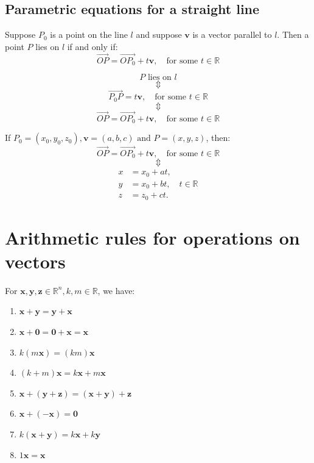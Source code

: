 \documentclass[11pt]{article}
\begin{document}
\newpage
\subsection{Parametric equations for a straight line}
\label{sec:org9b8d02a}
Suppose \(P_0\) is a point on the line \(l\) and suppose \(\boldsymbol{v}\) is a vector parallel to \(l\). Then a point \(P\) lies on \(l\) if and only if:
\[\overrightarrow{OP} = \overrightarrow{OP_0} + t \boldsymbol{v}, \quad \text{for some } t \in \mathbb{R}\]

\[P \text{ lies on } l\]
\[\Updownarrow\]
\[\overrightarrow{P_0 P} = t \boldsymbol{v}, \quad \text{for some } t \in \mathbb{R}\]
\[\Updownarrow\]
\[\overrightarrow{OP} = \overrightarrow{OP_0} + t \boldsymbol{v}, \quad \text{for some } t \in \mathbb{R}\]


If \(P_0 = (x_0, y_0, z_0), \boldsymbol{v} = (a, b, c) \text{ and } P = (x, y, z)\), then:
\[\overrightarrow{OP} = \overrightarrow{OP_0} + t \boldsymbol{v}, \quad \text{for some } t \in \mathbb{R}\]
\[\Updownarrow\]
\begin{align*}
x &= x_0 + at, \\
y &= x_0 + bt, \quad t \in \mathbb{R} \\
z &= z_0 + ct.
\end{align*}
\section{Arithmetic rules for operations on vectors}
\label{sec:org078b912}
For \(\boldsymbol{x}, \boldsymbol{y}, \boldsymbol{z} \in \mathbb{R}^n, k, m \in \mathbb{R}\), we have:

\begin{enumerate}
\item \(\boldsymbol{x} + \boldsymbol{y} = \boldsymbol{y} + \boldsymbol{x}\)
\item \(\boldsymbol{x} + \boldsymbol{0} = \boldsymbol{0} + \boldsymbol{x} = \boldsymbol{x}\)
\item \(k (m\boldsymbol{x}) = (km)\boldsymbol{x}\)
\item \((k + m)\boldsymbol{x} = k\boldsymbol{x} + m\boldsymbol{x}\)
\item \(\boldsymbol{x} + (\boldsymbol{y} + \boldsymbol{z}) = (\boldsymbol{x} + \boldsymbol{y}) + \boldsymbol{z}\)
\item \(\boldsymbol{x} + (- \boldsymbol{x}) = \boldsymbol{0}\)
\item \(k(\boldsymbol{x} + \boldsymbol{y}) = k\boldsymbol{x} + k\boldsymbol{y}\)
\item \(1\boldsymbol{x} = \boldsymbol{x}\)
\end{enumerate}
\end{document}
